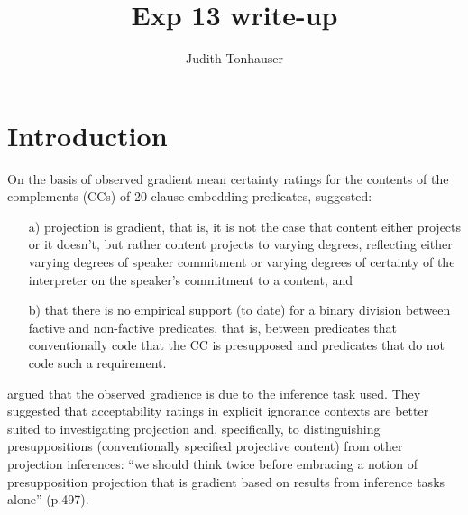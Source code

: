 \documentclass[11pt,fleqn]{article}
\title{Exp 13 write-up}
\author{Judith Tonhauser}
\newcommand{\6}{\mbox{$[\hspace*{-.6mm}[$}}
\newcommand{\9}{\mbox{$]\hspace*{-.6mm}]$}}
\begin{document}
\maketitle

\vspace*{-1cm}

\section{Introduction}\label{s-intro}

On the basis of observed gradient mean certainty ratings for the contents of the complements (CCs) of 20 clause-embedding predicates, \citealt{degen-tonhauser-openmind,degen-tonhauser-language} suggested:

\begin{itemize}
\item[a)] projection is gradient, that is, it is not the case that content either projects or it doesn't, but rather content projects to varying degrees, reflecting either varying degrees of speaker commitment or varying degrees of certainty of the interpreter on the speaker's commitment to a content, and

\item[b)] that there is no empirical support (to date) for a binary division between factive and non-factive predicates, that is, between predicates that conventionally code that the CC is presupposed and predicates that do not code such a requirement.
\end{itemize}

 \citealt[\S6.2]{mandelkern-etal2020} argued that the observed gradience is due to the inference task used. They suggested that acceptability ratings in explicit ignorance contexts are better suited to investigating projection and, specifically, to distinguishing presuppositions (conventionally specified projective content) from other projection inferences: ``we should think twice before embracing a notion of presupposition projection that is gradient based on results from inference tasks alone'' (p.497). 
\end{document}
